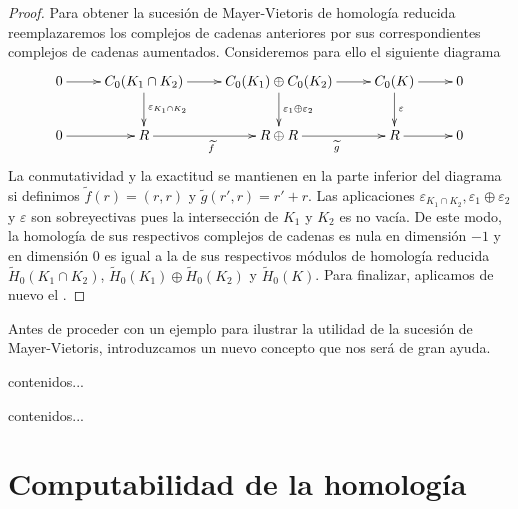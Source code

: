 \begin{proof}
	Para obtener la sucesión de Mayer-Vietoris de homología reducida reemplazaremos los complejos de cadenas anteriores por sus correspondientes complejos de cadenas aumentados. Consideremos para ello el siguiente diagrama
	\[
	\xymatrix{
		0 \ar@{->}[r] & C_0(K_1 \cap K_2) \ar@{->}[d]^{\varepsilon_{K_1 \cap K_2}} \ar@{->}[r] & C_0(K_1) \oplus C_0(K_2) \ar@{->}[r] \ar@{->}[d]^{\varepsilon_1 \oplus \varepsilon_2} & C_0(K) \ar@{->}[d]^{\varepsilon} \ar@{->}[r] & 0 \\
		0 \ar@{->}[r] & R \ar@{->}[r]_{\widetilde{f}} & R \oplus R \ar@{->}[r]_{\widetilde{g}} & R \ar@{->}[r] & 0
	}
	\]
	La conmutatividad y la exactitud se mantienen en la parte inferior del diagrama si definimos $\widetilde{f}(r) = (r,r)$ y $\widetilde{g}(r',r) = r'+r$. Las aplicaciones $\varepsilon_{K_1 \cap K_2}, \varepsilon_1 \oplus \varepsilon_2$ y $\varepsilon$ son sobreyectivas pues la intersección de $K_1$ y $K_2$ es no vacía. De este modo, la homología de sus respectivos complejos de cadenas es nula en dimensión $-1$ y en dimensión $0$ es igual a la de sus respectivos módulos de homología reducida $\widetilde{H}_0(K_1 \cap K_2)$, $\widetilde{H}_0(K_1) \oplus \widetilde{H}_0(K_2)$ y $\widetilde{H}_0(K)$. Para finalizar, aplicamos de nuevo el .
\end{proof}
Antes de proceder con un ejemplo para ilustrar la utilidad de la sucesión de Mayer-Vietoris, introduzcamos un nuevo concepto que nos será de gran ayuda.
\begin{definicion}
	contenidos...
\end{definicion}
\begin{ejemplo}
	contenidos...
\end{ejemplo}


\section{Computabilidad de la homología}

\endinput
